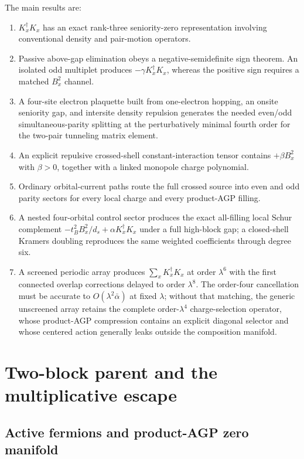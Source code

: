 \documentclass[11pt]{article}
\theoremstyle{definition}
\theoremstyle{remark}
\begin{document}
The main results are:
\begin{enumerate}
\item $K_x^\dagger K_x$ has an exact rank-three seniority-zero representation involving conventional density and pair-motion operators.
\item Passive above-gap elimination obeys a negative-semidefinite sign theorem.  An isolated odd multiplet produces $-\gamma K_x^\dagger K_x$, whereas the positive sign requires a matched $B_x^2$ channel.
\item A four-site electron plaquette built from one-electron hopping, an onsite seniority gap, and intersite density repulsion generates the needed even/odd simultaneous-parity splitting at the perturbatively minimal fourth order for the two-pair tunneling matrix element.
\item An explicit repulsive crossed-shell constant-interaction tensor contains $+\beta B_x^2$ with $\beta>0$, together with a linked monopole charge polynomial.
\item Ordinary orbital-current paths route the full crossed source into even and odd parity sectors for every local charge and every product-AGP filling.
\item A nested four-orbital control sector produces the exact all-filling local Schur complement $-t_B^2B_x^2/d_s+\alpha K_x^\dagger K_x$ under a full high-block gap; a closed-shell Kramers doubling reproduces the same weighted coefficients through degree six.
\item A screened periodic array produces $\sum_xK_x^\dagger K_x$ at order $\lambda^6$ with the first connected overlap corrections delayed to order $\lambda^8$.  The order-four cancellation must be accurate to $O(\lambda^2\bar\alpha)$ at fixed $\lambda$; without that matching, the generic unscreened array retains the complete order-$\lambda^4$ charge-selection operator, whose product-AGP compression contains an explicit diagonal selector and whose centered action generally leaks outside the composition manifold.
\end{enumerate}

\section{Two-block parent and the multiplicative escape}
\label{sec:parent}

\subsection{Active fermions and product-AGP zero manifold}
\end{document}
